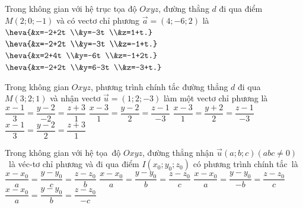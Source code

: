 \begin{ex}%
	Trong không gian với hệ trục tọa độ $Oxyz$,  đường thẳng $d$ đi qua điểm $M(2;0;-1)$ và có vectơ chỉ phương $\overrightarrow{a}=(4;-6;2)$ là
	 \def\dotEX{}
	 \choice
		 {$\heva{&x=-2+2t \\&y=-3t \\&z=1+t.}$}
		 {$\heva{&x=-2+2t \\&y=-3t \\&z=-1+t.}$}
		{\True $\heva{&x=2+4t \\&y=-6t \\&z=-1+2t.}$} 
		 {$\heva{&x=-2+2t \\&y=6-3t \\&z=-3+t.}$}
\end{ex}

\begin{ex}%
	Trong không gian $Oxyz$, phương trình chính tắc  đường thẳng $d$ đi qua $M(3;2;1)$ và nhận vectơ $\overrightarrow{u} = (1;2;-3)$ làm một vectơ chỉ phương là
	 \choice
		 {$\dfrac{x-1}{3}=\dfrac{y-2}{-2}=\dfrac{z+3}{1}$}
		{\True  $\dfrac{x-3}{1}=\dfrac{y-2}{2}=\dfrac{z-1}{-3}$}
		{$\dfrac{x-3}{1}=\dfrac{y+2}{2}=\dfrac{z-1}{-3}$} 
		 {$\dfrac{x-1}{3}=\dfrac{y-2}{2}=\dfrac{z+3}{1}$}
\end{ex}

\begin{ex}%
	Trong không gian với hệ tọa~độ $  Oxyz$, đường thẳng nhận ${\overrightarrow{u}}\left(a;b;c\right)\left({abc}\ne 0\right)$~là véc-tơ chỉ phương và đi qua điểm ${I}\left({x}_0;{{y}_0};{{z}_0}\right)$ có phương trình chính tắc~là
	 \choice
		{$\dfrac{x-x_0}{a}=\dfrac{y-y_0}{c}=\dfrac{z-z_0}{b}$} 
		 {\True $\dfrac{x-x_0}{a}=\dfrac{y-y_0}{b}=\dfrac{z-z_0}{c}$}
		{$\dfrac{x-x_0}{a}=\dfrac{y-y_0}{-b}=\dfrac{z-z_0}{c}$} 
		{$\dfrac{x-x_0}{a}=\dfrac{y-y_0}{b}=\dfrac{z-z_0}{-c}$} 
\end{ex}


